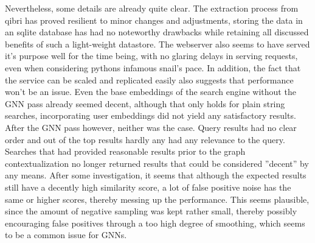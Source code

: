 \documentclass[draft,final]{vutinfth} %
\begin{document}
Nevertheless, some details are already quite clear. The extraction process from qibri has proved resilient to minor changes and adjustments, storing the data in an sqlite database has had no noteworthy drawbacks while retaining all discussed benefits of such a light-weight datastore. The webserver also seems to have served it's purpose well for the time being, with no glaring delays in serving requests, even when considering pythons infamous snail's pace. In addition, the fact that the service can be scaled and replicated easily also suggests that performance won't be an issue. Even the base embeddings of the search engine without the GNN pass already seemed decent, although that only holds for plain string searches, incorporating user embeddings did not yield any satisfactory results. After the GNN pass however, neither was the case. Query results had no clear order and out of the top results hardly any had any relevance to the query. Searches that had provided reasonable results prior to the graph contextualization no longer returned results that could be considered ''decent'' by any means. After some investigation, it seems that although the expected results still have a decently high similarity score, a lot of false positive noise has the same or higher scores, thereby messing up the performance. This seems plausible, since the amount of negative sampling was kept rather small, thereby possibly encouraging false positives through a too high degree of smoothing, which seems to be a common issue for GNNs. 
\end{document}
